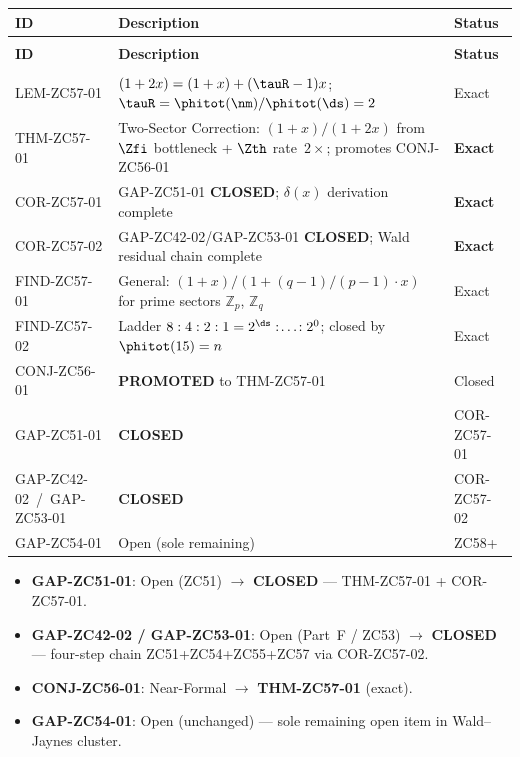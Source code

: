 \documentclass[12pt, a4paper]{article}
\begin{document}
\bigskip
{}
\begin{formalbox}[title={Atomic Registry --- ZC57}]
{\small
\setlength{\LTpre}{4pt}
\setlength{\LTpost}{4pt}
\renewcommand{\arraystretch}{1.30}
\begin{longtable}{>{\raggedright\arraybackslash}p{3.0cm}
                  >{\raggedright\arraybackslash}p{7.2cm}
                  >{\centering\arraybackslash}p{2.0cm}}
\toprule
\textbf{ID} & \textbf{Description} & \textbf{Status} \\
\midrule
\endfirsthead
\multicolumn{3}{l}{\small\textit{(continued)}}\\[4pt]
\toprule
\textbf{ID} & \textbf{Description} & \textbf{Status} \\
\midrule
\endhead
\midrule
\multicolumn{3}{r}{\small\textit{(continues)}}\\
\endfoot
\bottomrule
\endlastfoot
LEM-ZC57-01 &
  $(1+2x)=(1+x)+(\tauR-1)x$; $\tauR=\phitot(\nm)/\phitot(\ds)=2$ &
  Exact \\[4pt]
THM-ZC57-01 &
  Two-Sector Correction: $(1+x)/(1+2x)$ from $\Zfi$ bottleneck +
  $\Zth$ rate~$2\times$; promotes CONJ-ZC56-01 &
  \textbf{Exact} \\[4pt]
COR-ZC57-01 &
  GAP-ZC51-01 \textbf{CLOSED}; $\delta(x)$ derivation complete &
  \textbf{Exact} \\[4pt]
COR-ZC57-02 &
  GAP-ZC42-02/GAP-ZC53-01 \textbf{CLOSED};
  Wald residual chain complete &
  \textbf{Exact} \\[4pt]
FIND-ZC57-01 &
  General: $(1+x)/(1+(q{-}1)/(p{-}1){\cdot}x)$ for prime
  sectors $\mathbb{Z}_p$, $\mathbb{Z}_q$ &
  Exact \\[4pt]
FIND-ZC57-02 &
  Ladder $8:4:2:1=2^{\ds}:\!\ldots\!:2^0$;
  closed by $\phitot(15)=n$ &
  Exact \\[4pt]
\midrule
CONJ-ZC56-01 & \textbf{PROMOTED} to THM-ZC57-01 & Closed \\[4pt]
GAP-ZC51-01  & \textbf{CLOSED} & COR-ZC57-01 \\[4pt]
GAP-ZC42-02~/~GAP-ZC53-01 & \textbf{CLOSED} & COR-ZC57-02 \\[4pt]
GAP-ZC54-01  & Open (sole remaining) & ZC58+ \\
\end{longtable}
}
\end{formalbox}

\begin{keybox}[title={Gap Status Updates}]
\begin{itemize}[leftmargin=1.5em, noitemsep]
\item \textbf{GAP-ZC51-01}: Open (ZC51) $\to$ \textbf{CLOSED}
  --- THM-ZC57-01 + COR-ZC57-01.
\item \textbf{GAP-ZC42-02 / GAP-ZC53-01}: Open (Part~F / ZC53)
  $\to$ \textbf{CLOSED} --- four-step chain ZC51+ZC54+ZC55+ZC57
  via COR-ZC57-02.
\item \textbf{CONJ-ZC56-01}: Near-Formal $\to$
  \textbf{THM-ZC57-01} (exact).
\item \textbf{GAP-ZC54-01}: Open (unchanged) ---
  sole remaining open item in Wald--Jaynes cluster.
\end{itemize}
\end{keybox}
\end{document}
